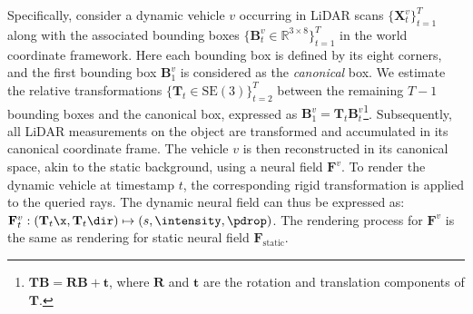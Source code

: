 Specifically, consider a dynamic vehicle $v$ 
occurring in LiDAR scans $\{\mathbf{X}^v_t\}_{t=1}^{T}$ along with the associated bounding boxes $\{\mathbf{B}^v_t \in \mathbb{R}^{3\times 8}\}_{t=1}^{T}$ in the world coordinate framework. Here each bounding box is defined by its eight corners, and the first bounding box $\mathbf{B}^v_1$ is considered as the \textit{canonical} box. We estimate the relative transformations $\{\mathbf{T}_t \in \text{SE}(3)\}_{t=2}^{T}$ between the remaining $T-1$ bounding boxes and the canonical box, expressed as $\mathbf{B}_1^v = \mathbf{T}_t \mathbf{B}_t^v$\footnote{$\mathbf{T}\mathbf{B} = \mathbf{R}\mathbf{B} + \mathbf{t}$, where $\mathbf{R}$ and $\mathbf{t}$ are the rotation and translation components of $\mathbf{T}$.}. 
Subsequently, all LiDAR measurements on the object are transformed and accumulated in its canonical coordinate frame. The vehicle $v$ is then reconstructed in its canonical space, akin to the static background, using a neural field $\mathbf{F}^v$. To render the dynamic vehicle at timestamp $t$, the corresponding rigid transformation is applied to the queried rays. The dynamic neural field can thus be expressed as: $\mathbf{F}^v_t: (\mathbf{T}_{t}\x, \mathbf{T}_{t}\dir) \mapsto (s, \intensity, \pdrop)$. The rendering process for $\mathbf{F}^v$ is the same as rendering for static neural field $\mathbf{F}_{\text{static}}$.
